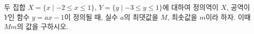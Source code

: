 두 집합 $X=\{x \mid -2\le x\le 1\}$, $Y=\{y \mid -3\le y\le 1\}$에 대하여 정의역이 $X$, 공역이 $Y$인 함수 $y=ax-1$이 정의될 때, 실수 $a$의 최댓값을 $M$, 최솟값을 $m$이라 하자. 이때 $Mm$의 값을 구하시오. 
